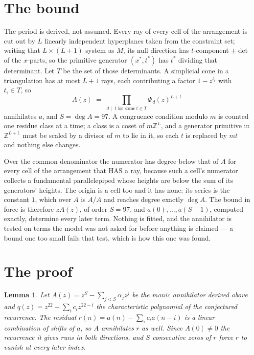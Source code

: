 \documentclass[11pt,a4paper]{article}
\theoremstyle{plain}
\newtheorem{lemma}[theorem]{Lemma}
\theoremstyle{definition}
\begin{document}
\section{The bound}

The period is derived, not assumed. Every ray of every cell of the arrangement is cut out by
$L$ linearly independent hyperplanes taken from the constraint set; writing that $L\times(L+1)$
system as $M$, its null direction has $t$-component $\pm\det$ of the $x$-parts, so the
primitive generator $(x^*,t^*)$ has $t^*$ dividing that determinant. Let $T$ be the set of
those determinants. A simplicial cone in a triangulation has at most $L+1$ rays, each
contributing a factor $1-z^{t_i}$ with $t_i\in T$, so
\[
A(z)\;=\;\prod_{d\,\mid\,t\ \text{for some}\ t\in T}\Phi_d(z)^{L+1}
\]
annihilates $a$, and $S=\deg A=97$. A congruence condition modulo $m$ is counted one residue
class at a time; a class is a coset of $m\mathbb{Z}^L$, and a generator primitive in
$\mathbb{Z}^{L+1}$ must be scaled by a divisor of $m$ to lie in it, so each $t$ is replaced
by $mt$ and nothing else changes.

Over the common denominator the numerator has degree below that of $A$ for every cell of the
arrangement that HAS a ray, because such a cell's numerator collects a fundamental
parallelepiped whose heights are below the sum of its generators' heights. The origin is a cell
too and it has none: its series is the constant $1$, which over $A$ is $A/A$ and reaches degree
exactly $\deg A$. The bound in force is therefore $zA(z)$, of order $S=97$, and
$a(0),\dots,a(S-1)$, computed exactly, determine every later term. Nothing is fitted, and the
annihilator is tested on terms the model was not asked for before anything is claimed --- a
bound one too small fails that test, which is how this one was found.

\section{The proof}

\begin{lemma}\label{lem:crit}
Let $A(z)=z^S-\sum_{j<S}\alpha_jz^{j}$ be the monic annihilator derived above and
$q(z)=z^{22}-\sum_ic_iz^{22-i}$ the characteristic polynomial of the conjectured
recurrence. The residual $r(n)=a(n)-\sum_ic_ia(n-i)$ is a linear combination of shifts of $a$,
so $A$ annihilates $r$ as well. Since $A(0)\ne0$ the recurrence it gives runs in both
directions, and $S$ consecutive zeros of $r$ force $r$ to vanish at every later index.
\end{lemma}
\end{document}

